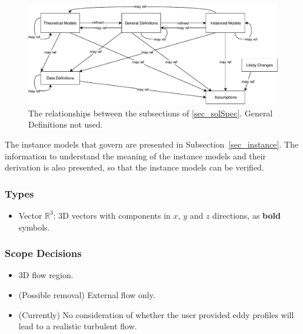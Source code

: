 \documentclass[12pt]{article}
\begin{document}

\begin{figure}[H]
  \begin{center}
    \includegraphics[scale=0.9]{RelationsBetweenTM_GD_IM_DD_A.pdf}
    \caption{The relationships between the subsections of \ref{sec_solSpec}. General Definitions not used.}
  \end{center}
\end{figure}

The instance models that govern \progname{} are presented in
Subsection~\ref{sec_instance}.  The information to understand the meaning of the
instance models and their derivation is also presented, so that the instance
models can be verified.

\subsubsection{Types}

\begin{itemize}
  \item Vector $\mathbb{R}^3$: 3D vectors with components in $x$, $y$ and $z$ directions, as \textbf{bold} symbols.
\end{itemize}


\subsubsection{Scope Decisions}
\begin{itemize}
  \item 3D flow region.
  \item (Possible removal) External flow only.
  \item (Currently) No consideration of whether the user provided eddy profiles will lead to a realistic turbulent flow.
\end{itemize}
\end{document}

